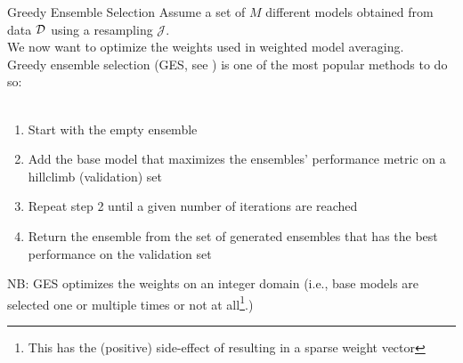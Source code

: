 \documentclass[11pt,compress,t,notes=noshow, aspectratio=169, xcolor=table]{beamer}
\begin{document}

\begin{vbframe}{Greedy Ensemble Selection}
Assume a set of $M$ different models obtained from data $\mathcal{D}$ using a resampling $\mathcal{J}$.\\
We now want to optimize the weights used in weighted model averaging.\\
\vfill
Greedy ensemble selection (GES, see \href{https://www.cs.cornell.edu/~alexn/papers/shotgun.icml04.revised.rev2.pdf}{}) is one of the most popular methods to do so:\\\
\begin{enumerate}
    \item Start with the empty ensemble
    \item Add the base model that maximizes the ensembles' performance metric on a hillclimb (validation) set
    \item Repeat step 2 until a given number of iterations are reached
    \item Return the ensemble from the set of generated ensembles that has the best performance on the validation set
\end{enumerate}
\vfill
NB: GES optimizes the weights on an integer domain (i.e., base models are selected one or multiple times or not at all\footnote{This has the (positive) side-effect of resulting in a sparse weight vector}.)
\end{vbframe}

\end{document}
